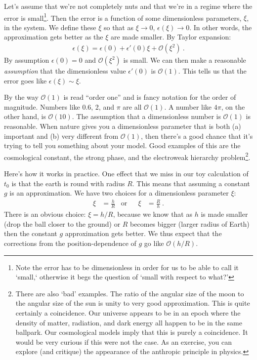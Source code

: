 Let’s assume that we’re not completely nuts and that we’re in a regime where the error is small\footnote{Note the error has to be dimensionless in order for us to be able to call it `small,` otherwise it begs the question of `small with respect to what?'}. Then the error is a function of some dimensionless parameters, $\xi$, in the system. We define these $\xi$ so that as $\xi \to 0$, $\epsilon(\xi) \to 0$. In other words, the approximation gets better as the $\xi$ are made smaller. By Taylor expansion:
\begin{align}
  \epsilon(\xi) = \epsilon(0) + \epsilon'(0) \xi + \mathcal O(\xi^2) \ .
\end{align}
By assumption  $\epsilon(0) = 0$ and $\mathcal O(\xi^2)$ is  small. We can then make a reasonable \emph{assumption} that the dimensionless value $\epsilon'(0)$  is $\mathcal O(1)$. This tells us that the error goes like $\epsilon(\xi) \sim \xi$.

By the way $\mathcal O(1)$ is read ``order one'' and is fancy notation for the order of magnitude. Numbers like 0.6, 2, and $\pi$ are all $\mathcal O(1)$. A number like $4\pi$, on the other hand, is $\mathcal O(10)$.  The assumption that a dimensionless number is $\mathcal O(1)$ is reasonable. When nature gives you a dimensionless parameter that is both (a) important and (b) very different from $\mathcal O(1)$, then there's a good chance that it's trying to tell you something about your model. Good examples of this are the cosmological constant, the strong  phase, and the electroweak hierarchy problem\footnote{There are also `bad' examples. The ratio of the angular size of the moon to the angular size of the sun is unity to very good approximation. This is quite certainly a coincidence. Our universe appears to be in an epoch where the density of matter, radiation, and dark energy all happen to be in the same ballpark. Our cosmological models imply that this is purely a coincidence. It would be very curious if this were not the case. As an exercise, you can explore (and critique) the appearance of the anthropic principle in physics.}. 

Here’s how it works in practice. One effect that we miss in our toy calculation of $t_0$ is that the earth is round with radius $R$. This means that assuming a constant $g$ is an approximation. We have two choices for a dimensionless parameter $\xi$:
\begin{align}
  \xi &= \frac{h}{R}
  &\text{or}&&
  \xi &= \frac{R}{h} \ .
\end{align}
There is an obvious choice: $\xi = h/R$, because we know that as $h$ is made smaller (drop the ball closer to the ground) or $R$ becomes bigger (larger radius of Earth) then the constant $g$ approximation gets better. We thus expect that the corrections from the position-dependence of $g$ go like $\mathcal O(h/R)$.
 
